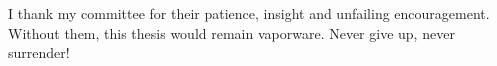 
I thank my committee for their patience, insight and unfailing encouragement. Without them, this thesis would remain vaporware. Never give up, never surrender!
